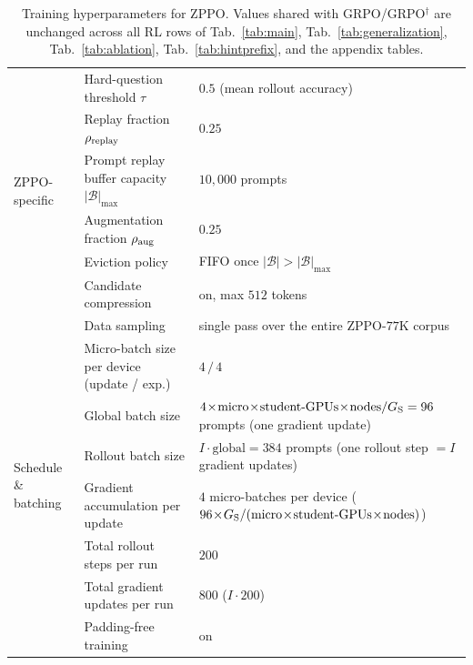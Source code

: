 \documentclass{llmxive}
\begin{document}
\begin{table}[!htbp]
{\begin{tabular}{lll}
        \midrule
        \multirow{6}{*}{ZPPO-specific}
            & Hard-question threshold $\tau$              & $0.5$ (mean rollout accuracy) \\
            & Replay fraction $\rho_{\rm replay}$         & $0.25$ \\
            & Prompt replay buffer capacity $|\mathcal{B}|_{\max}$ & $10{,}000$ prompts \\
            & Augmentation fraction $\rho_{\rm aug}$      & $0.25$ \\
            & Eviction policy                             & FIFO once $|\mathcal{B}|\!>\!|\mathcal{B}|_{\max}$ \\
            & Candidate compression                      & on, max $512$ tokens \\
        \midrule
        \multirow{8}{*}{Schedule \& batching}
            & Data sampling                               & single pass over the entire ZPPO-$77$K corpus \\
            & Micro-batch size per device (update / exp.)& $4\,/\,4$ \\
            & Global batch size                            & $4\!\times\!\text{micro}\!\times\!\text{student-GPUs}\!\times\!\text{nodes}/G_{\rm S}=96$ prompts (one gradient update) \\
            & Rollout batch size                          & $I\!\cdot\!\text{global}=384$ prompts (one rollout step $=I$ gradient updates) \\
            & Gradient accumulation per update            & $4$ micro-batches per device ($96\!\times\!G_{\rm S}/(\text{micro}\!\times\!\text{student-GPUs}\!\times\!\text{nodes})$) \\
            & Total rollout steps per run                 & $200$ \\
            & Total gradient updates per run              & $800$ ($I\!\cdot\!200$) \\
            & Padding-free training                       & on \\
        \bottomrule
    \end{tabular}}
    \caption{Training hyperparameters for ZPPO. Values shared with GRPO/GRPO$^{\dagger}$ are unchanged across all RL rows of Tab.~\ref{tab:main}, Tab.~\ref{tab:generalization}, Tab.~\ref{tab:ablation}, Tab.~\ref{tab:hintprefix}, and the appendix tables.}
    \label{tab:appendix:hyperparameters}
\end{table}
\end{document}
